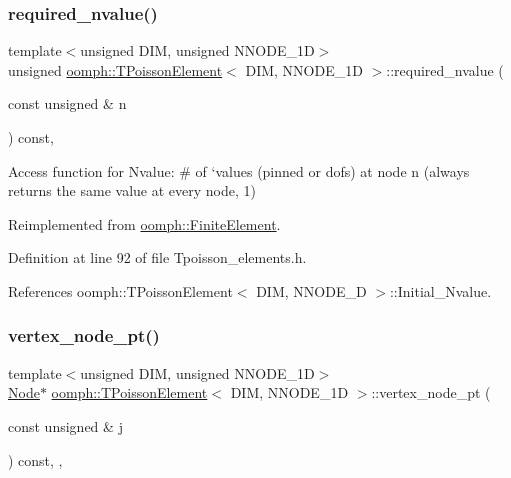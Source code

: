 \mbox{\label{classoomph_1_1TPoissonElement_aa79feab5549359f30145c96ee89023e1}} 
\subsubsection{\texorpdfstring{required\+\_\+nvalue()}{required\_nvalue()}}
{\footnotesize\ttfamily template$<$unsigned D\+IM, unsigned N\+N\+O\+D\+E\+\_\+1D$>$ \\
unsigned \hyperlink{classoomph_1_1TPoissonElement}{oomph\+::\+T\+Poisson\+Element}$<$ D\+IM, N\+N\+O\+D\+E\+\_\+1D $>$\+::required\+\_\+nvalue (\begin{DoxyParamCaption}\item[{const unsigned \&}]{n }\end{DoxyParamCaption}) const\hspace{0.3cm}{\ttfamily [inline]}, {\ttfamily [virtual]}}



Access function for Nvalue\+: \# of `values\textquotesingle{} (pinned or dofs) at node n (always returns the same value at every node, 1) 



Reimplemented from \hyperlink{classoomph_1_1FiniteElement_a56610c60d5bc2d7c27407a1455471b1a}{oomph\+::\+Finite\+Element}.



Definition at line 92 of file Tpoisson\+\_\+elements.\+h.



References oomph\+::\+T\+Poisson\+Element$<$ D\+I\+M, N\+N\+O\+D\+E\+\_\+D $>$\+::\+Initial\+\_\+\+Nvalue.

\mbox{\label{classoomph_1_1TPoissonElement_abe160776ed0c3a2281a3b75ef8ef3ef3}} 
\subsubsection{\texorpdfstring{vertex\+\_\+node\+\_\+pt()}{vertex\_node\_pt()}}
{\footnotesize\ttfamily template$<$unsigned D\+IM, unsigned N\+N\+O\+D\+E\+\_\+1D$>$ \\
\hyperlink{classoomph_1_1Node}{Node}$\ast$ \hyperlink{classoomph_1_1TPoissonElement}{oomph\+::\+T\+Poisson\+Element}$<$ D\+IM, N\+N\+O\+D\+E\+\_\+1D $>$\+::vertex\+\_\+node\+\_\+pt (\begin{DoxyParamCaption}\item[{const unsigned \&}]{j }\end{DoxyParamCaption}) const\hspace{0.3cm}{\ttfamily [inline]}, {\ttfamily [protected]}, {\ttfamily [virtual]}}



